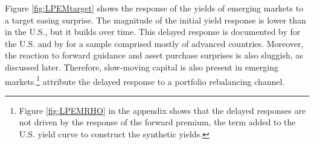 {%
Figure \ref{fig:LPEMtarget} shows the response of the yields of emerging markets to a target easing surprise.
The magnitude of the initial yield response %
is lower than in the U.S., but it builds over time.
This delayed response is documented by \cite{BrooksKatzLustig:2019} for the U.S. and by \cite{ACDM:2019} for a sample comprised mostly of advanced countries.
Moreover, the reaction to forward guidance and asset purchase surprises is also sluggish, as discussed later.
Therefore, slow-moving capital is also present in emerging markets.\footnote{ Figure \ref{fig:LPEMRHO} in the appendix shows that the delayed responses are not driven by the response of the forward premium, the term added to the U.S. yield curve to construct the synthetic yields.} %
\cite{BrooksKatzLustig:2019} attribute the delayed response to a portfolio rebalancing channel.

}
